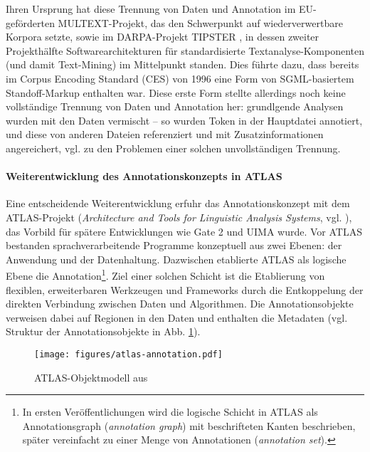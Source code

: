 \documentclass[abstracton, 12pt]{scrartcl}
\begin{document}
Ihren Ursprung hat diese Trennung von Daten und Annotation im EU-geförderten MUL\-TEXT-Projekt, das den Schwerpunkt auf wiederverwertbare Korpora setzte, sowie im DARPA-Projekt TIPSTER \citep{Harman1992}, in dessen zweiter Projekthälfte Softwarearchitekturen für standardisierte Text\-ana\-lyse-Komponenten (und damit Text-Mining) im Mittelpunkt standen. Dies führte dazu, dass bereits im Corpus Encoding Standard (CES) von 1996 eine Form von SGML-basiertem Standoff-Markup enthalten war. Diese erste Form stellte allerdings noch keine vollständige Trennung von Daten und Annotation her: grundlgende Analysen wurden mit den Daten vermischt -- so wurden Token in der Hauptdatei annotiert, und diese von anderen Dateien referenziert und mit Zusatzinformationen angereichert, vgl. \citealt{BendenAndHermes2004} zu den Problemen einer solchen unvollständigen Trennung.

\paragraph{Weiterentwicklung des Annotationskonzepts in ATLAS} \label{atlas}

Eine entscheidende Weiterentwicklung erfuhr das Annotationskonzept mit dem ATLAS-Projekt (\emph{Architecture and Tools for Linguistic Analysis Systems}, vgl. \citealt{BirdAndLiberman1999}), das Vorbild für spätere Entwicklungen wie Gate 2 \citep{CunninghamEtAl2002} und UIMA wurde. Vor ATLAS bestanden sprachverarbeitende Programme konzeptuell aus zwei Ebenen: der Anwendung und der Datenhaltung. Dazwischen etablierte ATLAS als logische Ebene die Annotation\footnote{In ersten Veröffentlichungen wird die logische Schicht in ATLAS als Annotationsgraph (\emph{annotation graph}) mit beschrifteten Kanten beschrieben, später vereinfacht zu einer Menge von Annotationen (\emph{annotation set}).}. Ziel einer solchen Schicht ist die Etablierung von flexiblen, erweiterbaren Werkzeugen und Frameworks durch die Entkoppelung der direkten Verbindung zwischen Daten und Algorithmen. Die Annotationsobjekte verweisen dabei auf Regionen in den Daten und enthalten die Metadaten (vgl. Struktur der Annotationsobjekte in Abb. \ref{atlas-model}).

\begin{figure}
\begin{center}
  \texttt{[image: figures/atlas-annotation.pdf]}
  \caption[ATLAS-Objektmodell]{ATLAS-Objektmodell aus \citealt{BirdAndLiberman1999}}
  \label{atlas-model}
\end{center}
\end{figure}
\end{document}
